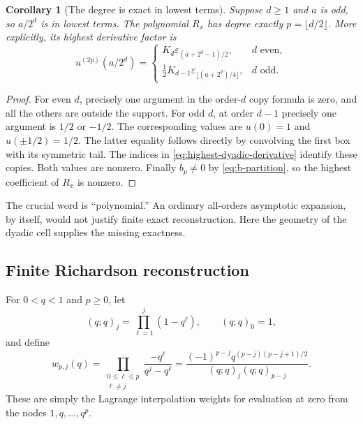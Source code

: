 \documentclass[11pt,a4paper]{article}
\numberwithin{equation}{section}
\newtheorem{corollary}[corollary]{Corollary}
\theoremstyle{definition}
\newcommand{\eps}{\varepsilon}
\begin{document}
\begin{corollary}[The degree is exact in lowest terms]\label{cor:exact-degree}
Suppose $d\geq1$ and $a$ is odd, so $a/2^d$ is in lowest terms.
The polynomial $R_x$ has degree exactly $p=\lfloor d/2\rfloor$.
More explicitly, its highest derivative factor is
\begin{equation}
 u^{(2p)}(a/2^d)=
 \begin{cases}
 K_d\eps_{(a+2^d-1)/2},&d\text{ even},\\[3pt]
 \frac12K_{d-1}\eps_{\lfloor(a+2^d)/4\rfloor},&d\text{ odd}.
 \end{cases}
 \label{eq:highest-dyadic-derivative}
\end{equation}
\end{corollary}
\begin{proof}
For even $d$, precisely one argument in the order-$d$ copy formula
is zero, and all the others are outside the support. For odd $d$,
at order $d-1$ precisely one argument is $1/2$ or $-1/2$.
The corresponding values are $u(0)=1$ and $u(\pm1/2)=1/2$.
The latter equality follows directly by convolving the first box
with its symmetric tail. The indices in
\eqref{eq:highest-dyadic-derivative} identify these copies. Both
values are nonzero. Finally $b_p\ne0$ by
\eqref{eq:b-partition}, so the highest coefficient of $R_x$
is nonzero.
\end{proof}

The crucial word is ``polynomial.'' An ordinary all-orders asymptotic
expansion, by itself, would not justify finite exact reconstruction.
Here the geometry of the dyadic cell supplies the missing exactness.

\subsection{Finite Richardson reconstruction}

For $0<q<1$ and $p\geq0$, let
\begin{equation}
 (q;q)_j=\prod_{\ell=1}^j(1-q^\ell),\qquad(q;q)_0=1,
\end{equation}
and define
\begin{equation}
 w_{p,j}(q)=
 \prod_{\substack{0\leq\ell\leq p\\\ell\ne j}}
       \frac{-q^\ell}{q^j-q^\ell}
 =\frac{(-1)^{p-j}q^{(p-j)(p-j+1)/2}}
       {(q;q)_j(q;q)_{p-j}}.
 \label{eq:qweights}
\end{equation}
These are simply the Lagrange interpolation weights for evaluation
at zero from the nodes $1,q,\ldots,q^p$.
\end{document}
